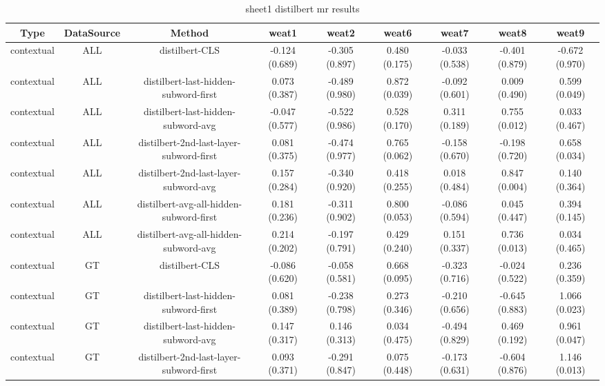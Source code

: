 \begin{sidewaystable}[htb]
    \centering
    \caption{sheet1 distilbert mr results}
    \label{appendix_tab:sheet1_distilbert_mr_results}
    \small
    \begin{tabular}{@{}ccccccccc@{}}
        \toprule
        Type & DataSource & Method & weat1 & weat2 & weat6 & weat7 & weat8 & weat9 \\
        \midrule
        contextual & ALL & distilbert-CLS & -0.124 (0.689) & -0.305 (0.897) & 0.480 (0.175) & -0.033 (0.538) & -0.401 (0.879) & -0.672 (0.970) \\
        contextual & ALL & distilbert-last-hidden-subword-first & 0.073 (0.387) & -0.489 (0.980) & 0.872 (0.039) & -0.092 (0.601) & 0.009 (0.490) & 0.599 (0.049) \\
        contextual & ALL & distilbert-last-hidden-subword-avg & -0.047 (0.577) & -0.522 (0.986) & 0.528 (0.170) & 0.311 (0.189) & 0.755 (0.012) & 0.033 (0.467) \\
        contextual & ALL & distilbert-2nd-last-layer-subword-first & 0.081 (0.375) & -0.474 (0.977) & 0.765 (0.062) & -0.158 (0.670) & -0.198 (0.720) & 0.658 (0.034) \\
        contextual & ALL & distilbert-2nd-last-layer-subword-avg & 0.157 (0.284) & -0.340 (0.920) & 0.418 (0.255) & 0.018 (0.484) & 0.847 (0.004) & 0.140 (0.364) \\
        contextual & ALL & distilbert-avg-all-hidden-subword-first & 0.181 (0.236) & -0.311 (0.902) & 0.800 (0.053) & -0.086 (0.594) & 0.045 (0.447) & 0.394 (0.145) \\
        contextual & ALL & distilbert-avg-all-hidden-subword-avg & 0.214 (0.202) & -0.197 (0.791) & 0.429 (0.240) & 0.151 (0.337) & 0.736 (0.013) & 0.034 (0.465) \\
        contextual & GT & distilbert-CLS & -0.086 (0.620) & -0.058 (0.581) & 0.668 (0.095) & -0.323 (0.716) & -0.024 (0.522) & 0.236 (0.359) \\
        contextual & GT & distilbert-last-hidden-subword-first & 0.081 (0.389) & -0.238 (0.798) & 0.273 (0.346) & -0.210 (0.656) & -0.645 (0.883) & 1.066 (0.023) \\
        contextual & GT & distilbert-last-hidden-subword-avg & 0.147 (0.317) & 0.146 (0.313) & 0.034 (0.475) & -0.494 (0.829) & 0.469 (0.192) & 0.961 (0.047) \\
        contextual & GT & distilbert-2nd-last-layer-subword-first & 0.093 (0.371) & -0.291 (0.847) & 0.075 (0.448) & -0.173 (0.631) & -0.604 (0.876) & 1.146 (0.013) \\

\end{tabular}
\end{sidewaystable}
